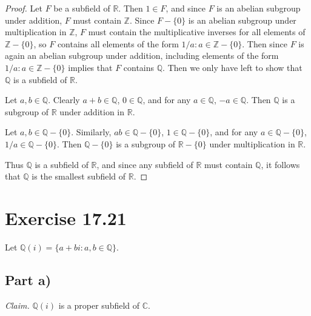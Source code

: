 \documentclass{abrice}
\newcommand{\Z}{\mathbb{Z}}
\newcommand{\R}{\mathbb{R}}
\newcommand{\Q}{\mathbb{Q}}
\renewcommand{\C}{\mathbb{C}}
\begin{document}
\begin{proof}
  Let $F$ be a subfield of $\R$. Then $1 \in F$, and since $F$ is an abelian
  subgroup under addition, $F$ must contain $\Z$. Since $F - \{0\}$ is an
  abelian subgroup under multiplication in $\Z$, $F$ must contain the
  multiplicative inverses for all elements of $\Z - \{0\}$, so $F$ contains all
  elements of the form $1/a : a \in \Z - \{0\}$. Then since $F$ is again an
  abelian subgroup under addition, including elements of the form $1/a : a \in
  \Z - \{0\}$ implies that $F$ contains $\Q$. Then we only have left to show
  that $\Q$ is a subfield of $\R$.

  Let $a,b \in \Q$. Clearly $a + b \in \Q$, $0 \in \Q$, and for any $a \in \Q$, $-a
  \in \Q$. Then $\Q$ is a subgroup of $\R$ under addition in $\R$.

  Let $a,b \in \Q - \{0\}$. Similarly, $ab \in \Q - \{0\}$, $1 \in \Q - \{0\}$,
  and for any $a \in \Q - \{0\}$, $1/a \in \Q - \{0\}$. Then $\Q - \{0\}$ is a
  subgroup of $\R - \{0\}$ under multiplication in $\R$.

  Thus $\Q$ is a subfield of $\R$, and since any subfield of $\R$ must contain
  $\Q$, it follows that $\Q$ is the smallest subfield of $\R$.
\end{proof}

\section{Exercise 17.21}

Let $\Q(i) = \{a + bi : a,b \in \Q \}$.

\subsection{Part a)}

\emph{Claim.} $\Q(i)$ is a proper subfield of $\C$.
\end{document}
